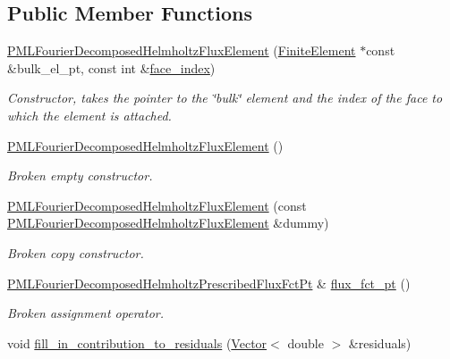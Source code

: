 \subsection*{Public Member Functions}
\begin{DoxyCompactItemize}
\item 
\hyperlink{classoomph_1_1PMLFourierDecomposedHelmholtzFluxElement_a168802ca10329d01a3274161b71bf615}{P\+M\+L\+Fourier\+Decomposed\+Helmholtz\+Flux\+Element} (\hyperlink{classoomph_1_1FiniteElement}{Finite\+Element} $\ast$const \&bulk\+\_\+el\+\_\+pt, const int \&\hyperlink{classoomph_1_1FaceElement_a478d577ac6db67ecc80f1f02ae3ab170}{face\+\_\+index})
\begin{DoxyCompactList}\small\item\em Constructor, takes the pointer to the \char`\"{}bulk\char`\"{} element and the index of the face to which the element is attached. \end{DoxyCompactList}\item 
\hyperlink{classoomph_1_1PMLFourierDecomposedHelmholtzFluxElement_a784b400c46607dbe67dd1c51d418cdb6}{P\+M\+L\+Fourier\+Decomposed\+Helmholtz\+Flux\+Element} ()
\begin{DoxyCompactList}\small\item\em Broken empty constructor. \end{DoxyCompactList}\item 
\hyperlink{classoomph_1_1PMLFourierDecomposedHelmholtzFluxElement_adedaa1af5b462492bbe2b6c9500e7774}{P\+M\+L\+Fourier\+Decomposed\+Helmholtz\+Flux\+Element} (const \hyperlink{classoomph_1_1PMLFourierDecomposedHelmholtzFluxElement}{P\+M\+L\+Fourier\+Decomposed\+Helmholtz\+Flux\+Element} \&dummy)
\begin{DoxyCompactList}\small\item\em Broken copy constructor. \end{DoxyCompactList}\item 
\hyperlink{classoomph_1_1PMLFourierDecomposedHelmholtzFluxElement_a21d234dc11d179dbe417b624c41e764f}{P\+M\+L\+Fourier\+Decomposed\+Helmholtz\+Prescribed\+Flux\+Fct\+Pt} \& \hyperlink{classoomph_1_1PMLFourierDecomposedHelmholtzFluxElement_ae27d4f85798035296911cdfef02a4d40}{flux\+\_\+fct\+\_\+pt} ()
\begin{DoxyCompactList}\small\item\em Broken assignment operator. \end{DoxyCompactList}\item 
void \hyperlink{classoomph_1_1PMLFourierDecomposedHelmholtzFluxElement_a25de3113d82c48966a78004d5b2bdca6}{fill\+\_\+in\+\_\+contribution\+\_\+to\+\_\+residuals} (\hyperlink{classoomph_1_1Vector}{Vector}$<$ double $>$ \&residuals)

\end{DoxyCompactItemize}

